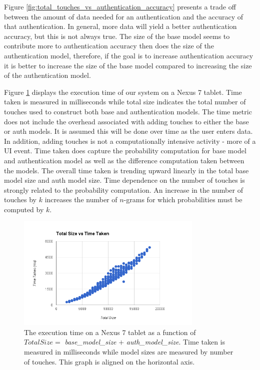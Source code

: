 \documentclass{acm_proc_article-sp}
\begin{document}
Figure \ref{fig:total_touches_vs_authentication_accuracy} presents a trade off between the amount of data needed for an authentication and the accuracy of that authentication.
In general, more data will yield a better authentication accuracy, but this is not always true.
The size of the base model seems to contribute more to authentication accuracy then does the size of the authentication model, therefore, if the goal is to increase authentication accuracy it is better to increase the size of the base model compared to increasing the size of the authentication model.

Figure \ref{fig:nexus_total_size_time} displays the execution time of our system on a Nexus 7 tablet. Time taken is measured in milliseconds while 
total size indicates the total number of touches used 
to construct both base and authentication models. 
%
The time metric does not include the overhead associated with adding touches to either the base or auth models. 
It is assumed this will be done over time as the user enters data.
In addition, adding touches is not a computationally intensive activity - more of a UI event. 
Time taken does capture 
the probability computation 
for base model and authentication model 
as well as the difference computation taken between the models.
%
The overall time taken is trending upward linearly in the total base model size and auth model size.
Time dependence on the number of touches is strongly related to
the probability computation.
An increase in the number of touches by $k$
increases the number of $n$-grams 
for which probabilities must be computed 
by $k$.

\begin{figure}
\centering
\includegraphics[width=3.5in]{nexus_total_size_time.png}
\caption{The execution time  on a Nexus 7 tablet as a function of
$Total Size =$ {\it base\_model\_size} $+$ {\it auth\_model\_size}.
Time taken is measured in milliseconds while model sizes are measured by number of touches.
This graph is aligned on the horizontal axis.}
\label{fig:nexus_total_size_time}
\end{figure}
\end{document}
